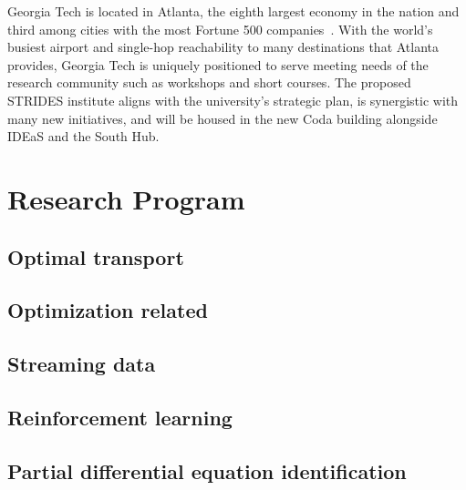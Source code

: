 \documentclass[12pt]{article}
\begin{document}
Georgia Tech is located in Atlanta, the eighth largest economy in the nation and third among
cities with the most Fortune 500 companies~\cite{geolounge2016}. With the world's busiest airport
and single-hop reachability to many destinations that Atlanta provides, Georgia Tech is
uniquely positioned to serve meeting needs of the research community such as workshops and short courses. The proposed STRIDES institute aligns with the university's strategic plan, is synergistic
with many new initiatives, and will be housed in the new Coda building alongside IDEaS and the South Hub.
\vspace*{-1em}

\section{Research Program}
\label{sec:proposed}

\vspace*{-1em}
\subsection{Optimal transport}
\label{sec:optimal-transport}



\vspace*{-1em}
\subsection{Optimization related}
\label{sec:optimization-related}



\vspace*{-1em}
\subsection{Streaming data}
\label{sec:stream-data}



\vspace*{-1em}
\subsection{Reinforcement learning}
\label{sec:reinforce-learn}



\vspace*{-1em}
\subsection{Partial differential equation identification}
\label{sec:pde-identify}
\end{document}
